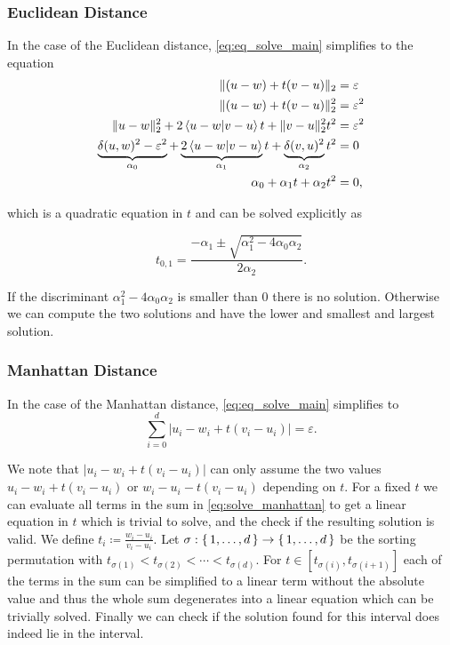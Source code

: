 \subsubsection{Euclidean Distance}
\label{subsubsec:eq_euclidean_distance}
In the case of the Euclidean distance, \cref{eq:eq_solve_main} simplifies to the equation 
\begin{align*}
  \| (u - w) + t(v - u) \|_2 &= \varepsilon \\
  \| (u - w) + t(v - u) \|_2^2 &= \varepsilon^2 \\
  \| u - w \|_2^2 + 2\braket{u - w | v - u} t  +  \| v - u \|_2^2 t^2 &= \varepsilon^2 \\
  \underbrace{\delta(u,w)^2 - \varepsilon^2}_{\alpha_0} + \underbrace{2\braket{u - w | v - u} }_{\alpha_1}t  +  \underbrace{\delta(v, u)^2}_{\alpha_2} t^2 &= 0 \\
  \alpha_0 + \alpha_1 t  + \alpha_2 t^2 &= 0,
\end{align*}

which is a quadratic equation in \(t\) and can be solved explicitly as 

\begin{equation}
  t_{0,1} = \frac{-\alpha_1 \pm \sqrt{\alpha_1^2 - 4\alpha_0\alpha_2}}{2\alpha_2}.\label{eq:sol_explicit_euclidean}
\end{equation}

If the discriminant \(\alpha_1^2 - 4\alpha_0\alpha_2\) is smaller than \(0\) there is no solution. Otherwise we can compute the two solutions and have the lower and smallest and largest solution. 


\subsubsection{Manhattan Distance}
\label{subsubsec:eq_manhattan_distance}
In the case of the Manhattan distance, \cref{eq:eq_solve_main} simplifies to 
\begin{equation}
  \sum_{i=0}^d |u_i - w_i + t (v_i - u_i)| = \varepsilon. \label{eq:solve_manhattan}
\end{equation}

We note that \(|u_i - w_i + t (v_i - u_i )|\) can only assume the two values \(u_i - w_i + t(v_i - u_i)\) or \(w_i - u_i - t(v_i - u_i)\) depending on \(t\). For a fixed \(t\) we can evaluate all terms in the sum in \cref{eq:solve_manhattan} to get a linear equation in \(t\) which is trivial to solve, and the check if the resulting solution is valid. We define \(t_i \coloneq \frac{w_i - u_i}{v_i - u_i} \). Let \(\sigma:\set{1,\dots, d} \to \set{1,\dots, d}\) be the sorting permutation with \(t_{\sigma(1)} < t_{\sigma(2)} < \cdots < t_{\sigma(d)}\). For \(t \in [t_{\sigma(i)}, t_{\sigma(i+1)}]\) each of the terms in the sum can be simplified to a linear term without the absolute value and thus the whole sum degenerates into a linear equation which can be trivially solved. Finally we can check if the solution found for this interval does indeed lie in the interval. 

